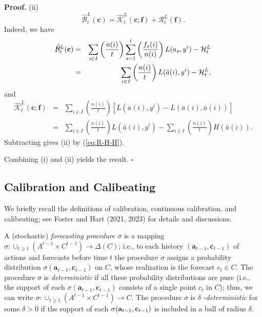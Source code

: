 \documentclass[12pt,a4paper,notitlepage]{article}
\newenvironment{proof}[1][Proof]{\noindent\textbf{#1.} }{\hfill $\square$}
\begin{document}
\begin{proof}
(ii)%
\begin{equation*}
\widehat{\mathcal{B}}_{t}^{L}(\mathbf{c})=\widehat{\mathcal{K}}_{t}^{L}(%
\mathbf{c};\mathbf{f})+\mathcal{R}_{t}^{L}(\mathbf{f}).
\end{equation*}%
Indeed, we have%
\begin{eqnarray*}
\widehat{\mathcal{B}}_{t}^{L}(\mathbf{c}) &=&\sum_{i\in I}\left( \frac{n(i)}{%
t}\right) \sum_{s=1}^{t}\left( \frac{f_{s}(i)}{n(i)}\right) L(a_{s},y^{i})-%
\mathcal{H}_{t}^{L} \\
&=&\sum_{i\in I}\left( \frac{n(i)}{t}\right) L(\bar{a}(i),y^{i})-\mathcal{H}%
_{t}^{L},
\end{eqnarray*}%
and%
\begin{eqnarray*}
\widehat{\mathcal{K}}_{t}^{L}(\mathbf{c};\mathbf{f}) &=&\sum_{i\in I}\left( 
\frac{n(i)}{t}\right) \left[ L(\bar{a}(i),y^{i})-L(\bar{a}(i),\bar{a}(i))%
\right] \\
&=&\sum_{i\in I}\left( \frac{n(i)}{t}\right) L(\bar{a}(i),y^{i})-\sum_{i\in
I}\left( \frac{n(i)}{t}\right) H(\bar{a}(i)).
\end{eqnarray*}%
Subtracting gives (ii) by (\ref{eq:R-H-H}).

Combining (i) and (ii) yields the result.
\end{proof}

\subsection{Calibration and Calibeating\label{sus:calib defs}}

We briefly recall the definitions of calibration, continuous calibration,
and calibeating; see Foster and Hart (2021, 2023) for details and
discussions.

A (stochastic) \emph{forecasting procedure} $\sigma $ is a mapping $\sigma
:\cup _{t\geq 1}(A^{t-1}\times C^{t-1})\rightarrow \Delta (C)$; i.e., to
each history $(\mathbf{a}_{t-1},\mathbf{c}_{t-1})$ of actions and forecasts
before time $t$ the procedure $\sigma $ assigns a probability distribution $%
\sigma (\mathbf{a}_{t-1},\mathbf{c}_{t-1})$ on $C$, whose realization is the
forecast $c_{t}\in C$. The procedure $\sigma $ is \emph{deterministic} if
all these probability distributions are pure (i.e., the support of each $%
\sigma (\mathbf{a}_{t-1},\mathbf{c}_{t-1})$ consists of a single point $%
c_{t} $ in $C$); thus, we can write $\sigma :\cup _{t\geq 1}(A^{t-1}\times
C^{t-1})\rightarrow C$. The procedure $\sigma $ is $\delta $\emph{%
-deterministic} for some $\delta >0$ if the support of each $\sigma (\mathbf{%
a}_{t-1},\mathbf{c}_{t-1})$ is included in a ball of radius $\delta $.
\end{document}
